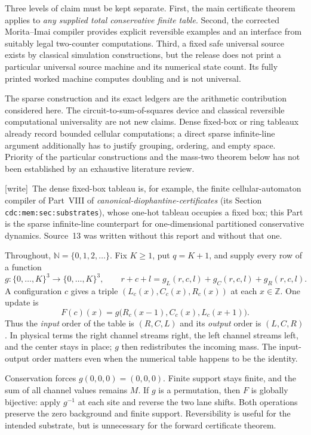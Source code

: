 \documentclass[11pt,letterpaper]{article}
\numberwithin{equation}{section}
\theoremstyle{definition}
\theoremstyle{remark}
\newcommand{\Z}{\mathbb Z}
\newcommand{\NN}{\mathbb N}
\newcommand{\wtag}{\textup{[write]}}
\begin{document}
Three levels of claim must be kept separate. First, the main certificate theorem applies to \emph{any supplied total conservative finite table}. Second, the corrected Morita--Imai compiler provides explicit reversible examples and an interface from suitably legal two-counter computations. Third, a fixed safe universal source exists by classical simulation constructions, but the release does not print a particular universal source machine and its numerical state count. Its fully printed worked machine computes doubling and is not universal.

The sparse construction and its exact ledgers are the arithmetic contribution considered here. The circuit-to-sum-of-squares device and classical reversible computational universality are not new claims. Dense fixed-box or ring tableaux already record bounded cellular computations; a direct sparse infinite-line argument additionally has to justify grouping, ordering, and empty space. Priority of the particular constructions and the mass-two theorem below has not been established by an exhaustive literature review.

\wtag\ The dense fixed-box tableau is, for example, the finite cellular-automaton compiler of Part~VIII of \emph{canonical-diophantine-certificates} (its Section \texttt{cdc:mem:sec:substrates}), whose one-hot tableau occupies a fixed box; this Part is the sparse infinite-line counterpart for one-dimensional partitioned conservative dynamics. Source~13 was written without this report and without that one.

Throughout, $\NN=\{0,1,2,\ldots\}$. Fix $K\ge1$, put $q=K+1$, and supply every row of a function
\[
 g:\{0,\ldots,K\}^3\longrightarrow\{0,\ldots,K\}^3,
 \qquad r+c+l=g_L(r,c,l)+g_C(r,c,l)+g_R(r,c,l).
\]
A configuration $c$ gives a triple $(L_c(x),C_c(x),R_c(x))$ at each $x\in\Z$. One update is
\begin{equation}\label{smc:sl:eq:physical}
 F(c)(x)=g\bigl(R_c(x-1),C_c(x),L_c(x+1)\bigr).
\end{equation}
Thus the \emph{input} order of the table is $(R,C,L)$ and its \emph{output} order is $(L,C,R)$. In physical terms the right channel streams right, the left channel streams left, and the center stays in place; $g$ then redistributes the incoming mass. The input-output order matters even when the numerical table happens to be the identity.

Conservation forces $g(0,0,0)=(0,0,0)$. Finite support stays finite, and the sum of all channel values remains $M$. If $g$ is a permutation, then $F$ is globally bijective: apply $g^{-1}$ at each site and reverse the two lane shifts. Both operations preserve the zero background and finite support. Reversibility is useful for the intended substrate, but is unnecessary for the forward certificate theorem.
\end{document}
